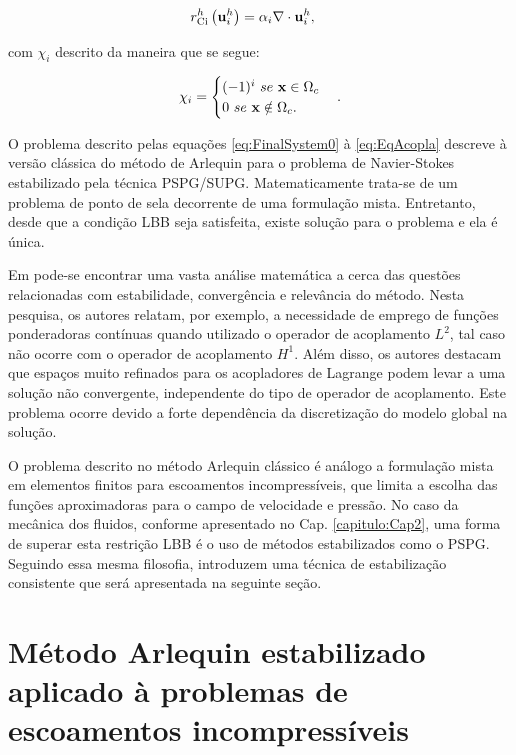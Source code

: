 \documentclass[tese_patricia]{subfiles}
\begin{document}
\noindent

\begin{align}
	r_{\mathrm{Ci}}^{h}\left(\mathbf{u}_i^{h}\right)&= \alpha_{i} \nabla \cdot \mathbf{u}_i^{h} \label{eq:resPreI}, 
\end{align}

\noindent com $\chi_{i}$ descrito da maneira que se segue:


\begin{align}
	\chi_{i} = \begin{cases} (-1)^{i} \ se \ \mathbf{x} \in \Omega_{c} \\
			   0 \ se \ \mathbf{x} \notin \Omega_{c}. \end{cases}						. 
\end{align}

O problema descrito pelas equações \ref{eq:FinalSystem0} à \ref{eq:EqAcopla} descreve à versão clássica do método de Arlequin para o problema de Navier-Stokes estabilizado pela técnica PSPG/SUPG. Matematicamente trata-se de um problema de ponto de sela decorrente de uma formulação mista. Entretanto, desde que a condição LBB seja satisfeita, existe solução para o problema e ela é única. 

Em  pode-se encontrar uma vasta análise matemática a cerca das questões relacionadas com estabilidade, convergência e relevância do método. Nesta pesquisa, os autores relatam, por exemplo, a necessidade de emprego de funções ponderadoras contínuas quando utilizado o operador de acoplamento $L^{2}$, tal caso não ocorre com o operador de acoplamento $H^{1}$. Além disso,  os autores destacam que espaços muito refinados para os acopladores de Lagrange podem levar a uma solução não convergente, independente do tipo de operador de acoplamento. Este problema ocorre devido a forte dependência da discretização do modelo global na solução.

O problema descrito no método Arlequin clássico é análogo a formulação mista em elementos finitos para escoamentos incompressíveis, que limita a escolha das funções aproximadoras para o campo de velocidade e pressão. No caso da mecânica dos fluidos, conforme apresentado no Cap. \ref{capitulo:Cap2}, uma forma de superar esta restrição LBB é o uso de métodos estabilizados como o PSPG. Seguindo essa mesma filosofia,   introduzem uma técnica de estabilização consistente que será apresentada na seguinte seção. 

\section{Método Arlequin estabilizado aplicado à problemas de escoamentos incompressíveis}
\end{document}
